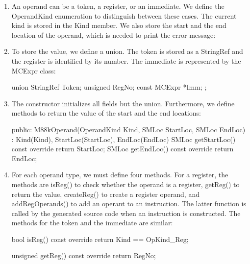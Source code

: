 \begin{enumerate}
\item
An operand can be a token, a register, or an immediate. We define the OperandKind enumeration to distinguish between these cases. The current kind is stored in the Kind member. We also store the start and the end location of the operand, which is needed to print the error message:

\begin{cpp}
class M88kOperand : public MCParsedAsmOperand {
    enum OperandKind { OpKind_Token, OpKind_Reg,
                        OpKind_Imm };
    OperandKind Kind;
    SMLoc StartLoc, EndLoc;
\end{cpp}

\item
To store the value, we define a union. The token is stored as a StringRef and the register is identified by its number. The immediate is represented by the MCExpr class:

\begin{cpp}
    union {
        StringRef Token;
        unsigned RegNo;
        const MCExpr *Imm;
    };
\end{cpp}

\item
The constructor initializes all fields but the union. Furthermore, we define methods to return the value of the start and the end locations:

\begin{cpp}
public:
    M88kOperand(OperandKind Kind, SMLoc StartLoc,
                SMLoc EndLoc)
        : Kind(Kind), StartLoc(StartLoc), EndLoc(EndLoc) {}
    SMLoc getStartLoc() const override { return StartLoc; }
    SMLoc getEndLoc() const override { return EndLoc; }
\end{cpp}

\item
For each operand type, we must define four methods. For a register, the methods are isReg() to check whether the operand is a register, getReg() to return the value, createReg() to create a register operand, and addRegOperands() to add an operant to an instruction. The latter function is called by the generated source code when an instruction is constructed. The methods for the token and the immediate are similar:

\begin{cpp}
bool isReg() const override {
    return Kind == OpKind_Reg;
}

unsigned getReg() const override { return RegNo; }


\end{cpp}
\end{enumerate}
